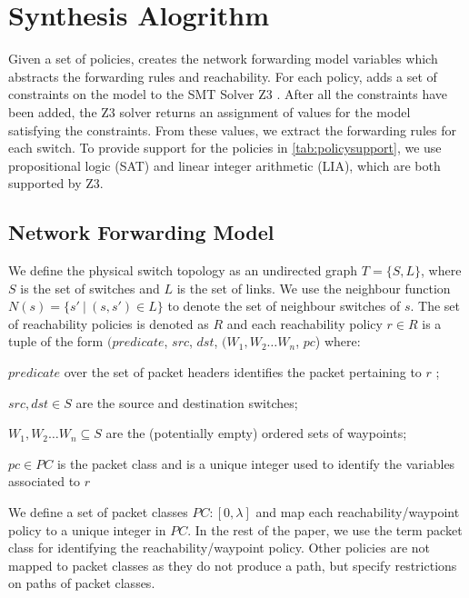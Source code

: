 \section{Synthesis Alogrithm}
Given a set of policies, \Name creates the network forwarding model variables which abstracts the forwarding rules and reachability. For each policy, \Name adds a set of constraints on the model to the SMT Solver Z3 \cite{z3}. After all the constraints have been added, the Z3 solver returns an assignment of values for the model satisfying the constraints. From these values, we extract the forwarding rules for each switch.
To provide support for the policies in \cref{tab:policysupport}, we use propositional logic (SAT) and linear integer arithmetic (LIA),
which are both supported by Z3. 
\subsection{Network Forwarding Model} \label{sec:fwdmodel}
We define the physical switch topology as an undirected graph $T=\{S, L\}$, 
where $S$ is the set of switches and $L$ is the set of links. 
We use the neighbour function $N(s) = \{s'\ | \ (s,s') \in L \}$ to denote 
the set of neighbour switches of $s$. 
The set of reachability policies is denoted as $R$ and each reachability policy $r \in R$ is
a tuple of the form $(predicate$, $src$, $dst$, $(W_1, W_2 \ldots W_n$, $pc$) where:
\begin{compactitemize}
\item  $predicate$ over the set of packet headers identifies the packet pertaining to $r$ ;
\item  $src,dst \in S$ are the source and destination switches;
\item $W_1, W_2 \ldots W_n \subseteq S$ are the (potentially empty) ordered sets of waypoints; 
\item $pc \in PC$ is the packet class and is a unique integer used to identify the variables associated to $r$
\end{compactitemize} 
 We define a set of packet classes $PC : [0,\lambda]$ and map each reachability/waypoint policy to a unique integer in $PC$. In the rest of the paper, we use the term packet class for identifying the reachability/waypoint policy. Other policies are not mapped to packet classes as they do not produce a path, but specify restrictions on paths of packet classes. 
